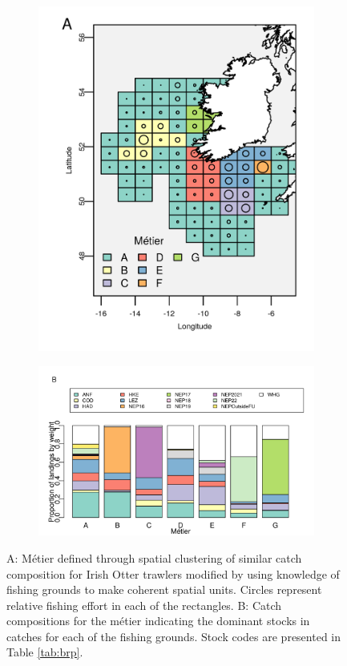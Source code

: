 \documentclass[12pt, halfline, a4paper]{ouparticle}
\begin{document}
\begin{figure}[!ht]
	\centering
\begin{subfigure}
	\centering
	\includegraphics[width=0.6\linewidth]{figures/Final_Metier_locations}
\end{subfigure}
\begin{subfigure}
	\centering
	\includegraphics[width=0.8\linewidth]{figures/Final_Metier_catchcomp}
\end{subfigure}
\caption{A: Métier defined through spatial clustering of similar catch
	composition for Irish Otter trawlers modified by using knowledge of
	fishing grounds to make coherent spatial units. Circles represent
	relative fishing effort in each of the rectangles. B: Catch
	compositions for the métier indicating the dominant stocks in catches
	for each of the fishing grounds. Stock codes are presented in Table
	\ref{tab:brp}.} 
	\label{fig:metier}

\end{figure}	
\end{document}
